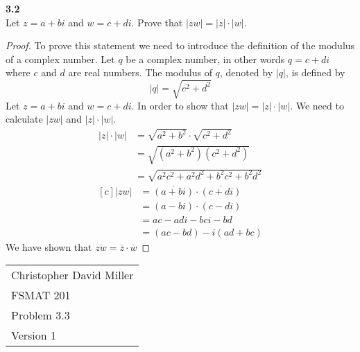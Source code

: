 \documentclass[12pt]{article}
\begin{document}
  
  \textbf{3.2} \\  %
  Let $z = a + bi$ and $w = c + di $. Prove that $\lvert zw \rvert = \lvert z \rvert \cdot \lvert w \rvert$.
  
  \begin{proof}
    To prove this statement we need to introduce the definition of the modulus of a complex number. Let $q$ be a complex number, in other words $q = c + di$ where $c$ and $d$ are real numbers. The modulus of $q$, denoted by $\lvert q \rvert$, is defined by $$\lvert q \rvert= \sqrt{c^2 + d^2}$$
    Let $z = a + bi$ and $w = c + di $. In order to show that  $\lvert zw \rvert = \lvert z \rvert \cdot \lvert w \rvert$. We need to calculate $\lvert zw \rvert$ and $\lvert z \rvert \cdot \lvert w \rvert.$
    $$\begin{aligned}
      \lvert z \rvert \cdot \lvert w \rvert &= \sqrt{a^2 + b^2} \cdot \sqrt{c^2 + d^2} \\ 
       &= \sqrt{(a^2 + b^2)(c^2 + d^2)}\\
       &= \sqrt{a^2c^2 + a^2d^2 + b^2c^2+b^2d^2}
    \end{aligned}$$
    \begin{equation*}
      \begin{aligned}[c]
        \lvert zw \rvert &= \overline{(a+bi)} \cdot \overline{(c+di)} \\ 
         &= (a-bi) \cdot (c-di)\\
         &= ac -adi-bci-bd\\
         &= (ac-bd)-i(ad+bc)  
      \end{aligned}
    \end{equation*}
    We have shown that $\overline{zw} = \overline{z} \cdot \overline{w}$
      
        
        
  
      
  \end{proof}
  \newpage
\begin{flushright}
  \begin{tabular}{l}
  Christopher David Miller \\  %
  FSMAT 201 \\  %
  Problem 3.3 \\  %
  Version 1 \\ %
  \end{tabular}
  \end{flushright}
  \vspace{20pt}  %
  
\end{document}
